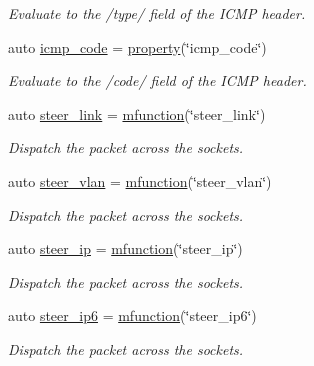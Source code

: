 \begin{DoxyCompactItemize}
\begin{DoxyCompactList}\small\item\em Evaluate to the /type/ field of the I\+C\+M\+P header. \end{DoxyCompactList}\item 
auto \hyperlink{namespacepfq_1_1lang_1_1anonymous__namespace_02default_8hpp_03_a026262dd85de1db88a8303ed0f3dac18}{icmp\+\_\+code} = \hyperlink{namespacepfq_1_1lang_a3f461785d825c3f5e024dd65c18ea3dc}{property}(\char`\"{}icmp\+\_\+code\char`\"{})
\begin{DoxyCompactList}\small\item\em Evaluate to the /code/ field of the I\+C\+M\+P header. \end{DoxyCompactList}\item 
auto \hyperlink{namespacepfq_1_1lang_1_1anonymous__namespace_02default_8hpp_03_ac1f3f9a2caf886a1441e62860a4ca058}{steer\+\_\+link} = \hyperlink{namespacepfq_1_1lang_ac3ec84f09576bf5fb5db464623a4c165}{mfunction}(\char`\"{}steer\+\_\+link\char`\"{})
\begin{DoxyCompactList}\small\item\em Dispatch the packet across the sockets. \end{DoxyCompactList}\item 
auto \hyperlink{namespacepfq_1_1lang_1_1anonymous__namespace_02default_8hpp_03_a2c6a8ad5a3ae8b60a6a3d18a510f22ac}{steer\+\_\+vlan} = \hyperlink{namespacepfq_1_1lang_ac3ec84f09576bf5fb5db464623a4c165}{mfunction}(\char`\"{}steer\+\_\+vlan\char`\"{})
\begin{DoxyCompactList}\small\item\em Dispatch the packet across the sockets. \end{DoxyCompactList}\item 
auto \hyperlink{namespacepfq_1_1lang_1_1anonymous__namespace_02default_8hpp_03_afe1c69c555a75021f7e637086cb1264c}{steer\+\_\+ip} = \hyperlink{namespacepfq_1_1lang_ac3ec84f09576bf5fb5db464623a4c165}{mfunction}(\char`\"{}steer\+\_\+ip\char`\"{})
\begin{DoxyCompactList}\small\item\em Dispatch the packet across the sockets. \end{DoxyCompactList}\item 
auto \hyperlink{namespacepfq_1_1lang_1_1anonymous__namespace_02default_8hpp_03_a02291b124a4aa900d78797e386517f69}{steer\+\_\+ip6} = \hyperlink{namespacepfq_1_1lang_ac3ec84f09576bf5fb5db464623a4c165}{mfunction}(\char`\"{}steer\+\_\+ip6\char`\"{})
\begin{DoxyCompactList}\small\item\em Dispatch the packet across the sockets. \end{DoxyCompactList}\item 

\end{DoxyCompactItemize}
